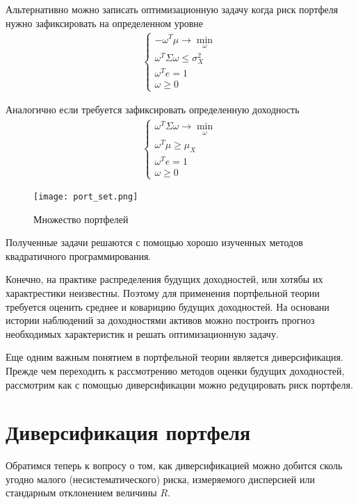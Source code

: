 Альтернативно можно записать оптимизационную задачу когда риск портфеля нужно зафиксировать на определенном уровне
\begin{align}
	\begin{cases}
		-\omega^T \mu \rightarrow \min_{\omega} \\
		\omega^T \Sigma \omega \le \sigma_X^2 \\
		\omega^T e = 1 \\
		\omega \ge 0
	\end{cases}
\end{align}

Аналогично если требуется зафиксировать определенную доходность
\begin{align}
	\begin{cases}
		\omega^T \Sigma \omega \rightarrow \min_{\omega} \\
		\omega^T \mu \ge \mu_X \\
		\omega^T e = 1 \\
		\omega \ge 0
	\end{cases}
\end{align}

\begin{figure}[H]
	\centering
	\texttt{[image: port\_set.png]}
	\caption{Множество портфелей}
	\label{fig:port_set}
\end{figure}

Полученные задачи решаются с помощью хорошо изученных методов квадратичного программирования.

Конечно, на практике распределения будущих доходностей, или хотябы их характрестики неизвестны.
Поэтому для применения портфельной теории требуется оценить среднее и коварицию будущих доходностей.
На основани истории наблюдений за доходностями активов можно построить прогноз необходимых характеристик
и решать оптимизационную задачу.

Еще одним важным понятием в портфельной теории является диверсификация. Прежде чем переходить к рассмотрению методов оценки
будущих доходностей, рассмотрим как с помощью диверсификации можно редуцировать риск портфеля.

\section{Диверсификация портфеля}

Обратимся теперь к вопросу о том, как диверсификацией можно добится сколь угодно малого (несистематического) риска, измеряемого дисперсией
или стандарным отклонением величины $R$.

